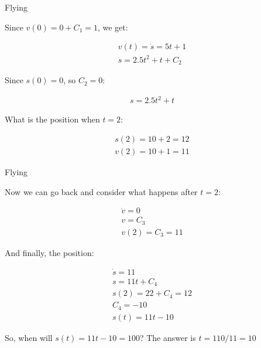 \documentclass{beamer}
\begin{document}
\begin{frame}{Flying}
	\begin{flushleft}
		
		
		Since $v(0) = 0 + C_1 = 1$, we get:
		
		\begin{align}
			v(t) = \dot s = 5 t + 1 \\
			s = 2.5 t^2 + t + C_2 
		\end{align}		
		
		Since $s(0) = 0$, so $C_2 = 0$:
		
		\begin{align}
			s = 2.5 t^2 + t 
		\end{align}			
		
		What is the position when $t = 2$:
		
		\begin{align}
	s(2) = 10 + 2 = 12 \\
	v(2) = 10 + 1 = 11
		\end{align}			
		
	\end{flushleft}
\end{frame}



\begin{frame}{Flying}
	\begin{flushleft}
		
		
		Now we can go back and consider what happens after $t = 2$:
		
		\begin{align}
	\dot v = 0 \\
	v = C_3\\
	v(2) = C_3 = 11
		\end{align}				
		
		And finally, the position:
		
				\begin{align}
			\dot s = 11 \\
			s = 11 t + C_4\\
			s(2) = 22 + C_4 = 12 \\
			C_4 = -10 \\
			s(t) = 11 t - 10
		\end{align}		
	
	So, when will $s(t) = 11 t - 10  = 100$? The answer is $t = 110 / 11 = 10$		
		
	\end{flushleft}
\end{frame}
\end{document}
